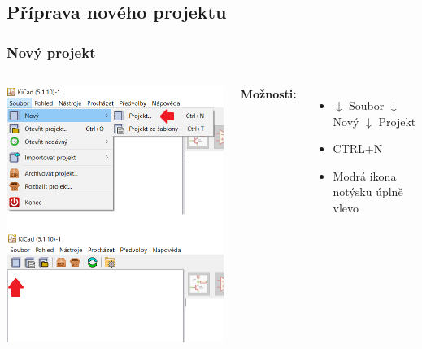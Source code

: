 \documentclass{beamer}
\begin{document}
\subsection{\texorpdfstring{Příprava nového projektu}{Priprava noveho projektu}}
\begin{frame}
	\frametitle{Nový projekt}
	\begin{columns}
	
		\begin{center}
			\includegraphics[width=\textwidth]{obr/prj_novy01.png}
		\end{center}
	
		\textbf{Možnosti:}
		\begin{itemize}
			\item $\downarrow$ Soubor $\downarrow$ Nový $\downarrow$ Projekt
			\item CTRL+N
			\item Modrá ikona notýsku úplně vlevo
		\end{itemize}
	\end{columns}
\end{frame}
\end{document}
